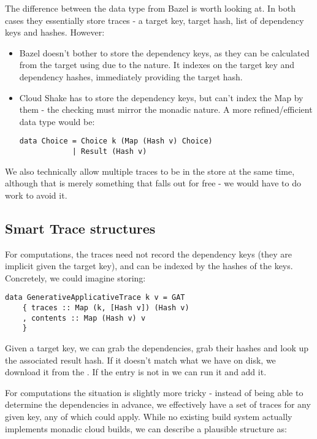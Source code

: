 The difference between the data type from Bazel is worth looking at. In both cases they essentially store traces - a target key, target hash, list of dependency keys and hashes. However:

\begin{itemize}
\item Bazel doesn't bother to store the dependency keys, as they can be calculated from the target using  due to the  nature. It indexes on the target key and dependency hashes, immediately providing the target hash.
\item Cloud Shake has to store the dependency keys, but can't index the Map by them - the checking must mirror the monadic nature. A more refined/efficient data type would be:
\begin{verbatim}
data Choice = Choice k (Map (Hash v) Choice)
            | Result (Hash v)
\end{verbatim}
\end{itemize}

We also technically allow multiple traces to be in the store at the same time, although that is merely something that falls out for free - we would have to do work to avoid it.

\subsection{Smart Trace structures}
\label{sec-smart-traces}


For  computations, the traces need not record the dependency keys (they are implicit given the target key), and can be indexed by the hashes of the keys. Concretely, we could imagine storing:

\begin{verbatim}
data GenerativeApplicativeTrace k v = GAT
    { traces :: Map (k, [Hash v]) (Hash v)
    , contents :: Map (Hash v) v
    }
\end{verbatim}

Given a target key, we can grab the dependencies, grab their hashes and look up the associated result hash. If it doesn't match what we have on disk, we download it from the . If the entry is not in  we can run it and add it.

For  computations the situation is slightly more tricky - instead of being able to determine the dependencies in advance, we effectively have a set of traces for any given key, any of which could apply. While no existing build system actually implements monadic cloud builds, we can describe a plausible structure as:

